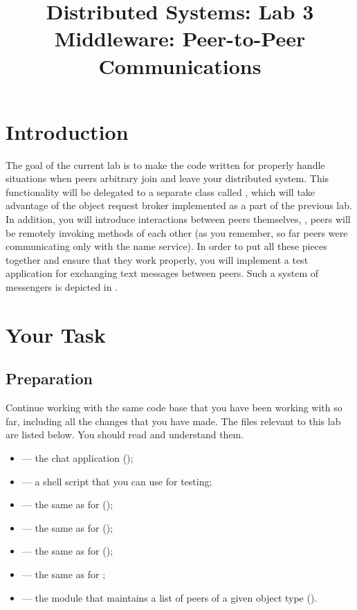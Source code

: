 \documentclass[a4paper]{article}
\title{%
  Distributed Systems: Lab 3\\%
  Middleware: Peer-to-Peer Communications%
}
\author{}
\begin{document}
\maketitle

\section{Introduction}

The goal of the current lab is to make the code written for  properly
handle situations when peers arbitrary join and leave your distributed system.
This functionality will be delegated to a separate class called
, which will take advantage of the object request broker
implemented as a part of the previous lab. In addition, you will introduce
interactions between peers themselves, \ie, peers will be remotely invoking
methods \cite{lecture3} of each other (as you remember, so far peers were
communicating only with the name service). In order to put all these pieces
together and ensure that they work properly, you will implement a test
application for exchanging text messages between peers. Such a system of
messengers is depicted in .

\section{Your Task}
\subsection{Preparation}
Continue working with the same code base that you have been working with so far,
including all the changes that you have made. The files relevant to this lab are
listed below. You should read and understand them.
\begin{itemize}

  \item {} --- the chat application (\leave);

  \item {} --- a shell script that you can use for testing;

  \item {} --- the same as for
   (\leave);

  \item {} --- the same as for 
  (\overwrite);

  \item {} --- the same as for 
  (\overwrite);

  \item {} --- the same as for ;

  \item {} --- the module that maintains a
  list of peers of a given object type (\fix).

\end{itemize}
\end{document}
